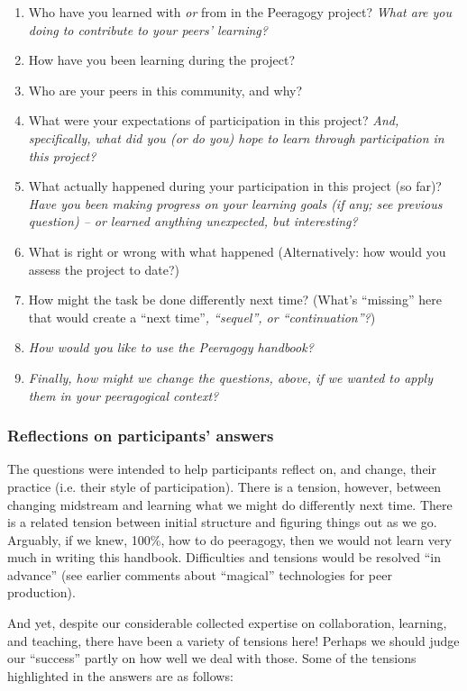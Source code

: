 \begin{enumerate}
\item
  Who have you learned with \emph{or} from in the Peeragogy project?
  \emph{What are you doing to contribute to your peers' learning?}
\item
  How have you been learning during the project?
\item
  Who are your peers in this community, and why?
\item
  What were your expectations of participation in this project?
  \emph{And, specifically, what did you (or do you) hope to learn
  through participation in this project?}
\item
  What actually happened during your participation in this project (so
  far)? \emph{Have you been making progress on your learning goals (if
  any; see previous question) -- or learned anything unexpected, but
  interesting?}
\item
  What is right or wrong with what happened (Alternatively: how would
  you assess the project to date?)
\item
  How might the task be done differently next time? (What's ``missing''
  here that would create a ``next time''\emph{, ``sequel'', or
  ``continuation''?})
\item
  \emph{How would you like to use the Peeragogy handbook?}
\item
  \emph{Finally, how might we change the questions, above, if we wanted
  to apply them in your peeragogical context?}
\end{enumerate}
\subsubsection{\textbf{Reflections on participants' answers}}

The questions were intended to help participants reflect on, and change,
their practice (i.e. their style of participation). There is a tension,
however, between changing midstream and learning what we might do
differently next time. There is a related tension between initial
structure and figuring things out as we go. Arguably, if we knew, 100\%,
how to do peeragogy, then we would not learn very much in writing this
handbook. Difficulties and tensions would be resolved ``in advance''
(see earlier comments about ``magical'' technologies for peer
production).

And yet, despite our considerable collected expertise on collaboration,
learning, and teaching, there have been a variety of tensions here!
Perhaps we should judge our ``success'' partly on how well we deal with
those. Some of the tensions highlighted in the answers are as follows:

